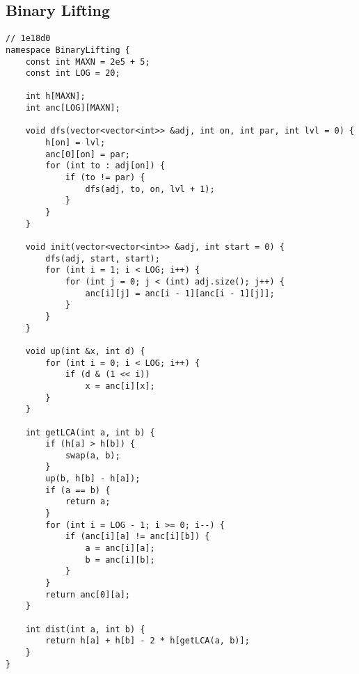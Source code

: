 \documentclass[12pt, a4paper, twoside]{article}
\begin{document}
\subsection{Binary Lifting
}
\begin{lstlisting}
// 1e18d0
namespace BinaryLifting {
	const int MAXN = 2e5 + 5;
	const int LOG = 20;

	int h[MAXN];
	int anc[LOG][MAXN];

	void dfs(vector<vector<int>> &adj, int on, int par, int lvl = 0) {
		h[on] = lvl;
		anc[0][on] = par;
		for (int to : adj[on]) {
			if (to != par) {
				dfs(adj, to, on, lvl + 1);
			}
		}
	}

	void init(vector<vector<int>> &adj, int start = 0) {
		dfs(adj, start, start);
		for (int i = 1; i < LOG; i++) {
			for (int j = 0; j < (int) adj.size(); j++) {
				anc[i][j] = anc[i - 1][anc[i - 1][j]];
			}
		}
	}

	void up(int &x, int d) {
		for (int i = 0; i < LOG; i++) {
			if (d & (1 << i))
				x = anc[i][x];
		}
	}

	int getLCA(int a, int b) {
		if (h[a] > h[b]) {
			swap(a, b);
		}
		up(b, h[b] - h[a]);
		if (a == b) {
			return a;
		}
		for (int i = LOG - 1; i >= 0; i--) {
			if (anc[i][a] != anc[i][b]) {
				a = anc[i][a];
				b = anc[i][b];
			}
		}
		return anc[0][a];
	}

	int dist(int a, int b) {
		return h[a] + h[b] - 2 * h[getLCA(a, b)];
	}
}
\end{lstlisting}
\end{document}
